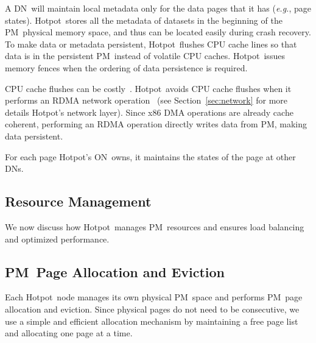 \documentclass[sigconf]{acmart}
\renewcommand{\em}{\it}
\newcommand{\eg}{\textit{e.g.}}
\newcommand{\nvm}{PM}
\newcommand{\hotpot}{Hotpot}
\newcommand{\on}{ON}
\newcommand{\dn}{DN}
\providecommand{\DIFaddbegin}{} %
\providecommand{\DIFaddend}{} %
\providecommand{\DIFdelbegin}{} %
\providecommand{\DIFdelend}{} %
\begin{document}
{
A \dn\ will maintain local metadata only for the data pages that it has (\eg, page states).
\hotpot\ stores all the metadata of datasets in the beginning of the \nvm\ physical memory space,
and thus can be located easily during crash recovery.
To make data or metadata persistent, \hotpot\ flushes CPU cache lines
so that data is in the persistent \nvm\ instead of volatile CPU caches.
\hotpot\ issues memory fences when the ordering of data persistence is required.

CPU cache flushes can be costly~\cite{Zhang15-NVMMStudy}.
\hotpot\ avoids CPU cache flushes when it performs an RDMA network operation~\cite{Zhang15-Mojim}
(see Section~\ref{sec:network} for more details \hotpot's network layer).
Since x86 DMA operations are already cache coherent, performing an RDMA operation
directly writes data from \nvm, making data persistent.


For each page \hotpot's \on\ owns,
it maintains the states of the page at other \dn{}s.
\fi

\DIFdelbegin %
\DIFdelend \subsection{Resource Management}
\label{sec:resource}
\DIFdelbegin %
\DIFdelend We now discuss how \hotpot\ manages \nvm\ resources
and ensures load balancing and optimized performance.
\fi

\DIFdelbegin %
\DIFdelend \DIFaddbegin \subsection{\nvm\ Page Allocation and Eviction}
\DIFaddend \label{sec:eviction}
\DIFdelbegin %
\DIFdelend Each \hotpot\ node manages its own physical \nvm\ space and performs \nvm\ page allocation and eviction.
Since physical pages do not need to be consecutive,
we use a simple and efficient allocation mechanism by maintaining a free page list
and allocating one page at a time.

}
\end{document}

